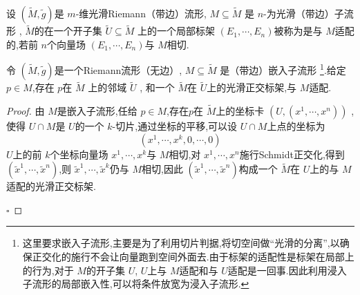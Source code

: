 \documentclass[../../几何与拓扑.tex]{subfiles}
\begin{document}
\begin{definition}
    设 \(  \left( \tilde{M}, \tilde{g}  \right)   \)是  \(  m  \)-维光滑Riemann（带边）流形, \(  M\subseteq  \tilde{M}  \)  是 \(  n  \)-为光滑（带边）子流形 , 
     \(  \tilde{M}  \)的在一个开子集 \(  \tilde{U} \subseteq  \tilde{M}  \)  上的一个局部标架 \(  \left(  E_1,\cdots,E_n  \right)   \)被称为是与 \(  M  \)适配的,若前 \(  n  \)个向量场 \(  \left(  E_1,\cdots,E_n  \right)   \)与 \(  M  \)相切.     
\end{definition}


\begin{proposition}\label{寻找适配的正交标架}
    令 \(  \left( \tilde{M},\tilde{g}  \right)   \)是一个Riemann流形（无边）, \(  M\subseteq \tilde{M}   \)  是（带边）嵌入子流形 \footnote{这里要求嵌入子流形,主要是为了利用切片判据,将切空间做“光滑的分离”,以确保正交化的施行不会让向量跑到空间外面去.由于标架的适配性是标架在局部上的行为,对于 \(  M  \)的开子集 \(  U  \), \(  U  \)上与 \(  M  \)适配和与 \(  U  \)适配是一回事.因此利用浸入子流形的局部嵌入性,可以将条件放宽为浸入子流形.     }.给定 \(  p \in M  \),存在 \(  p  \)在 \(  \tilde{M}  \)   上的邻域 \(  \tilde{U}  \) ,
    和一个 \(  \tilde{M}  \)在 \(  \tilde{U}  \)上的光滑正交标架,与 \(  M  \)适配.   
\end{proposition}

\begin{proof}
    由 \(  M  \)是嵌入子流形,任给 \(  p \in M  \),存在\(  p  \)在 \(  \tilde{M}  \)上的坐标卡 \(  \left( U,\left(  x^1,\cdots,x^n  \right)  \right)   \) ,使得 \(  U\cap M  \)是 \(  U  \)的一个 \(  k  \)-切片,通过坐标的平移,可以设 \(  U  \cap M\)上点的坐标为 \[
    \left( x^{1},\cdots ,x^{k},0,\cdots ,0 \right) 
    \] \(  U  \)上的前 \(  k  \)个坐标向量场 \(   x^1,\cdots,x^k   \)与 \(  M  \)相切,对   \(   x^1,\cdots,x^n   \)施行Schmidt正交化,得到 \(  \left( \tilde{x}^{1},\cdots ,\tilde{x}^{n} \right)   \),则 \(  \tilde{x}^{1},\cdots ,\tilde{x}^{k}  \)仍与  \(  M  \)相切,因此 \(  \left( \tilde{x}^{1},\cdots ,\tilde{x}^{n} \right)   \)构成一个 \(  \tilde{M}  \)在 \(  U  \)上的与 \(  M  \)适配的光滑正交标架.       
 
    \hfill $\square$
\end{proof}
\end{document}
